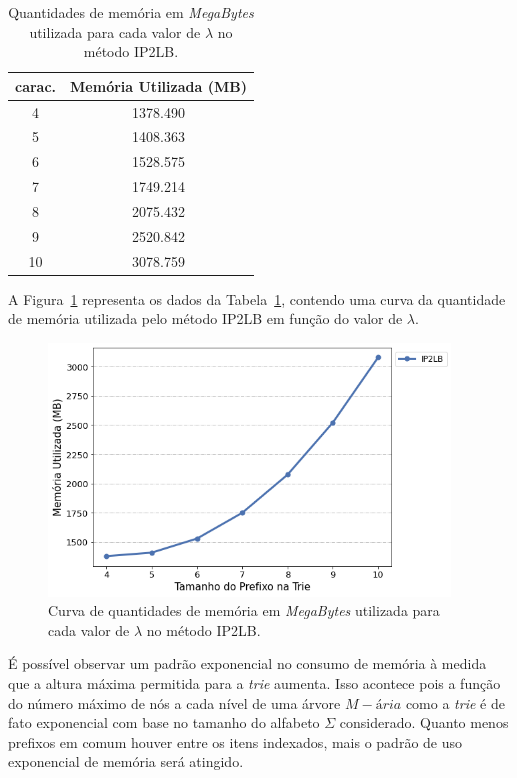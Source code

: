 \begin{table}[!ht]
\centering
\begin{tabular}{|c|c|}
\hline
\textbf{carac.} & \textbf{Memória Utilizada (MB)} \\ \hline
4 & 1378.490 \\ \hline
5 & 1408.363 \\ \hline
6 & 1528.575 \\ \hline
7 & 1749.214 \\ \hline
8 & 2075.432 \\ \hline
9 & 2520.842 \\ \hline
10 & 3078.759 \\ \hline
\end{tabular}
\caption{Quantidades de memória em \textit{MegaBytes} utilizada para cada valor de $\lambda$ no método IP2LB.}
\label{tab:memory-usage-usaddr-tau-3}
\end{table}

A Figura~\ref{fig:memory-usage-usaddr-tau-3} representa os dados da Tabela~\ref{tab:memory-usage-usaddr-tau-3}, contendo uma curva da quantidade de memória utilizada pelo método IP2LB em função do valor de $\lambda$.

\begin{figure}[!ht]
    \centering
    \includegraphics[width=0.95\textwidth]{figures/memory_usage_IP2LB_dataset_usaddr_tau_3.png}
    \caption{Curva de quantidades de memória em \textit{MegaBytes} utilizada para cada valor de $\lambda$ no método IP2LB.}
    \label{fig:memory-usage-usaddr-tau-3}
\end{figure}

É possível observar um padrão exponencial no consumo de memória à medida que a altura máxima permitida para a \textit{trie} aumenta. Isso acontece pois a função do número máximo de nós a cada nível de uma árvore $M-\text{á}ria$ como a \textit{trie} \citep{Knuth:1998} é de fato exponencial com base no tamanho do alfabeto $\Sigma$ considerado. Quanto menos prefixos em comum houver entre os itens indexados, mais o padrão de uso exponencial de memória será atingido.

